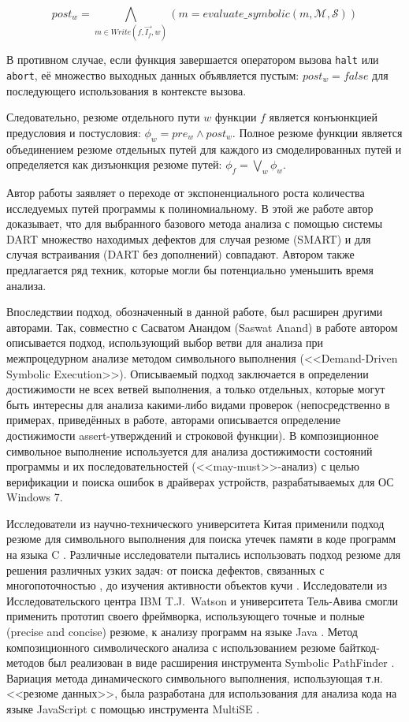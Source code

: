 \begin{equation*}
 post_w = \bigwedge_{m \in Write(f, \overrightarrow{I_f}, w)}(m = evaluate\_symbolic(m, \mathcal{M}, \mathcal{S}))
\end{equation*}

В противном случае, если функция завершается оператором вызова \texttt{halt} или \texttt{abort}, её множество выходных данных объявляется пустым: $post_w = false$ для последующего использования в контексте вызова.

Следовательно, резюме отдельного пути $w$ функции $f$ является конъюнкцией предусловия и постусловия: $\phi_w = pre_w \wedge post_w$. Полное резюме функции является объединением резюме отдельных путей для каждого из смоделированных путей и определяется как дизъюнкция резюме путей: $\phi_f = \bigvee_w \phi_w$.

Автор работы заявляет о переходе от экспоненциального роста количества исследуемых путей программы к полиномиальному. В этой же работе автор доказывает, что для выбранного базового метода анализа с помощью системы DART множество находимых дефектов для случая резюме (SMART) и для случая встраивания (DART без дополнений) совпадают. Автором также предлагается ряд техник, которые могли бы потенциально уменьшить время анализа.

Впоследствии подход, обозначенный в данной работе, был расширен другими авторами. Так, совместно с Сасватом Анандом (Saswat Anand) в работе \cite{anand-godefroid} автором описывается подход, использующий выбор ветви для анализа при межпроцедурном анализе методом символьного выполнения (<<Demand-Driven Symbolic Execution>>). Описываемый подход заключается в определении достижимости не всех ветвей выполнения, а только отдельных, которые могут быть интересны для анализа какими-либо видами проверок (непосредственно в примерах, приведённых в работе, авторами описывается определение достижимости assert-утверждений и строковой функции). В \cite{may-must} композиционное символьное выполнение используется для анализа достижимости состояний программы и их последовательностей (<<may-must>>-анализ) с целью верификации и поиска ошибок в драйверах устройств, разрабатываемых для ОС Windows 7. 

Исследователи из научно-технического университета Китая применили подход резюме для символьного выполнения для поиска утечек памяти в коде программ на языка C \cite{melton}. Различные исследователи пытались использовать подход резюме для решения различных узких задач: от поиска дефектов, связанных с многопоточностью \cite{summary-concurrent}, до изучения активности объектов кучи \cite{summary-heap}. Исследователи из Исследовательского центра IBM T.J.~Watson и университета Тель-Авива смогли применить прототип своего фреймворка, использующего точные и полные (precise and concise) резюме, к анализу программ на языке Java \cite{precise-summary}. Метод композиционного символического анализа с использованием резюме байткод-методов был реализован в виде расширения инструмента Symbolic PathFinder \cite{compos-dse}. Вариация метода динамического символьного выполнения, использующая т.н. <<резюме данных>>, была разработана для использования для анализа кода на языке JavaScript с помощью инструмента MultiSE \cite{multi-se}.

